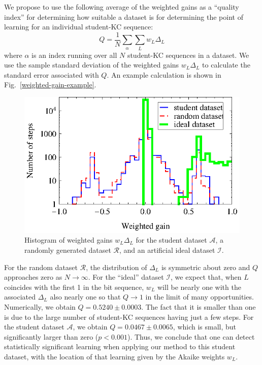 \documentclass{edm_template}
\begin{document}
We propose to use the following average of the weighted gains as
a ``quality index'' for determining how suitable a 
dataset is for determining the point of learning for an individual
student-KC sequence:
%
\begin{equation}
           Q= \frac{1}{N} \sum_\alpha \sum_L w_L \Delta_L
\end{equation}
%
where $\alpha$ is an index running over all $N$ student-KC sequences in a 
dataset.
We use the sample standard deviation of the weighted gains $w_L \Delta_L$
to calculate the standard error associated with $Q$. 
An example calculation is shown in Fig.~\ref{weighted-gain-example}.

\begin{figure}
  \centering \includegraphics{weighted-gain-histogram2.eps}
   \caption{Histogram of weighted gains $w_L \Delta_L$ for
     the student dataset $\mathcal{A}$, 
     a randomly generated dataset $\mathcal{R}$,
     and an artificial ideal dataset $\mathcal{I}$.}
    \label{weighted-gain-histogram2}
\end{figure}

For the random dataset $\mathcal{R}$, the distribution of $\Delta_L$
is symmetric about zero and $Q$ approaches zero as $N \to \infty$.
For the ``ideal'' dataset $\mathcal{I}$, we expect that, when
$L$ coincides with the first 1 in
the bit sequence, $w_L$ will be nearly one with the associated $\Delta_L$
also nearly one so that $Q\to 1$ in the limit of many opportunities.
Numerically, we obtain $Q=0.5240\pm0.0003$.  The fact that it is
smaller than one is due to the large number of student-KC sequences having
just a few steps.  For the student dataset $\mathcal{A}$, we obtain
$Q=0.0467\pm0.0065$, which is small, but significantly larger than zero
($p<0.001$). Thus, we conclude that one can detect statistically
significant learning when applying our method to this student dataset,
with the location of that learning given by the Akaike weights $w_L$.
\end{document}
